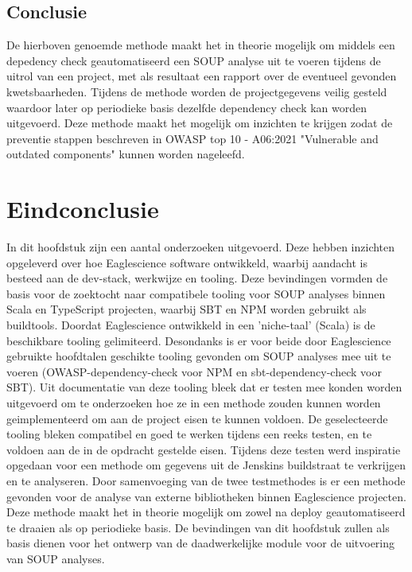 \begin{itemize}
    \subsection{Conclusie}\label{sec:conclusie}
    De hierboven genoemde methode maakt het in theorie mogelijk om middels een depedency check geautomatiseerd een SOUP analyse uit te voeren tijdens de uitrol van een project, met als resultaat een rapport over de eventueel gevonden kwetsbaarheden. Tijdens de methode worden de projectgegevens veilig gesteld waardoor later op periodieke basis dezelfde dependency check kan worden uitgevoerd.
    Deze methode maakt het mogelijk om inzichten te krijgen zodat de preventie stappen beschreven in OWASP top 10 - A06:2021 "Vulnerable and outdated components" kunnen worden nageleefd.


    \section{Eindconclusie}\label{sec:Eindconclusie}
    In dit hoofdstuk zijn een aantal onderzoeken uitgevoerd. Deze hebben inzichten opgeleverd over hoe Eaglescience software ontwikkeld, waarbij aandacht is besteed aan de dev-stack, werkwijze en tooling. Deze bevindingen vormden de basis voor de zoektocht naar compatibele tooling voor SOUP analyses binnen Scala en TypeScript projecten, waarbij SBT en NPM worden gebruikt als buildtools. Doordat Eaglescience ontwikkeld in een 'niche-taal' (Scala) is de beschikbare tooling gelimiteerd. Desondanks is er voor beide door Eaglescience gebruikte hoofdtalen geschikte tooling gevonden om SOUP analyses mee uit te voeren (OWASP-dependency-check voor NPM en sbt-dependency-check voor SBT). Uit documentatie van deze tooling bleek dat er testen mee konden worden uitgevoerd om te onderzoeken hoe ze in een methode zouden kunnen worden geimplementeerd om aan de project eisen te kunnen voldoen. De geselecteerde tooling bleken compatibel en goed te werken tijdens een reeks testen, en te voldoen aan de in de opdracht gestelde eisen. Tijdens deze testen werd inspiratie opgedaan voor een methode om gegevens uit de Jenskins buildstraat te verkrijgen en te analyseren. Door samenvoeging van de twee testmethodes is er een methode gevonden voor de analyse van externe bibliotheken binnen Eaglescience projecten. Deze methode maakt het in theorie mogelijk om zowel na deploy geautomatiseerd te draaien als op periodieke basis. De bevindingen van dit hoofdstuk zullen als basis dienen voor het ontwerp van de daadwerkelijke module voor de uitvoering van SOUP analyses.



\end{itemize}

